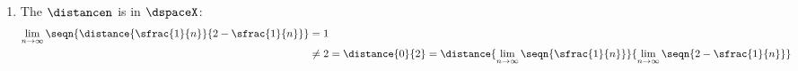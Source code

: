 \begin{example}
\begin{enumerate}
  \item The  $\distancen$ is  in $\dspaceX$:
    \begin{align*}
        \lim_{n\to\infty}\seqn{\distance{\sfrac{1}{n}}{2-\sfrac{1}{n}}} 
        &= 1 
      \\&\neq 2 = \distance{0}{2} = \distance{\lim_{n\to\infty}\seqn{\sfrac{1}{n}}}{\lim_{n\to\infty}\seqn{2-\sfrac{1}{n}}}
    \end{align*}
\end{enumerate}
\end{example}

